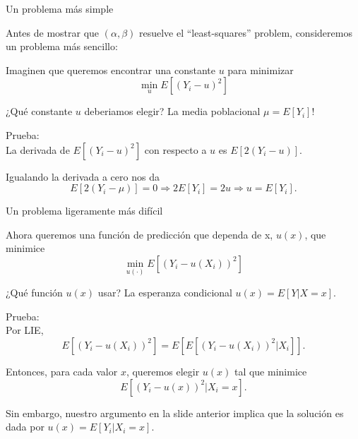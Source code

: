 \documentclass[11pt,handout,aspectratio=169]{beamer}
\newenvironment{wideitemize}{\itemize\addtolength{\itemsep}{10pt}}{\enditemize}
\begin{document}
\begin{frame}{Un problema más simple}
\begin{wideitemize}
	\item
	Antes de mostrar que $(\alpha,\beta)$ resuelve el ``least-squares'' problem, consideremos un problema más sencillo:
	
	\pause
	\item
	Imaginen que queremos encontrar una constante $u$ para minimizar
	$$\min_u E[ (Y_i - u)^2 ]$$
	
	\pause
	\item
	¿Qué constante $u$ deberiamos elegir? \pause La media poblacional $\mu=E[Y_i]$!
	
	\pause
	\item
	Prueba: \\
	
	La derivada de $E[ (Y_i - u)^2 ]$ con respecto a $u$ es $E[ 2(Y_i - u) ]$.  \\ \pause
	
	
Igualando la derivada a cero nos da
	$$E[ 2(Y_i - \mu) ] = 0 \Rightarrow 2 E[Y_i] = 2 u \Rightarrow u = E[Y_i].$$
	
\end{wideitemize}	
\end{frame}

\begin{frame}{Un problema ligeramente más difícil}
\vspace{0.2cm}
\begin{wideitemize}

	\item
	Ahora queremos una función de predicción que dependa de x, $u(x)$, que minimice
	$$\min_{u(\cdot)} E[ (Y_i - u(X_i))^2  ]$$
	
	\pause
	\item
	¿Qué función $u(x)$ usar? \pause La esperanza condicional $u(x) = E[Y|X= x]$. 
	
	\pause
	\item
	Prueba: \\
	Por LIE,
	$$E[ (Y_i - u(X_i))^2  ] = E[  E[  (Y_i - u(X_i)) ^2| X_i  ]   ] .$$
	
	\pause
	Entonces, para cada valor  $x$, queremos elegir $u(x)$ tal que minimice
	$$E[ (Y_i - u(x))^2 | X_i = x ].$$ 
	
	\pause Sin embargo, nuestro argumento en la slide anterior implica que la solución es dada por $u(x) = E[Y_i | X_i = x]$. 
\end{wideitemize}
\end{frame}
\end{document}
